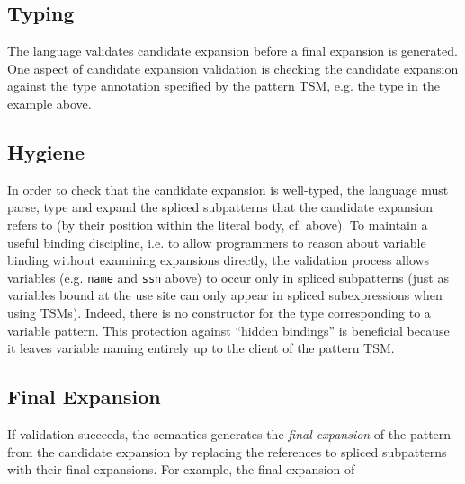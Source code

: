 {{{\subsection{Typing}\label{sec:ptsms-validation}
The language validates candidate expansion before a final expansion is generated. One aspect of candidate expansion validation is checking the candidate expansion against the type annotation specified by the pattern TSM, e.g. the type  in the example above.

\subsection{Hygiene}\label{sec:ptsms-hygiene}
In order to check that the candidate expansion is well-typed, the language must parse, type and expand the spliced subpatterns that the candidate expansion refers to (by their position within the literal body, cf. above). To maintain a useful binding discipline, i.e. to allow programmers to reason about variable binding without examining expansions directly, the validation process allows variables (e.g. \lstinline{name} and \lstinline{ssn} above) to occur only in spliced subpatterns (just as variables bound at the use site can only appear in spliced subexpressions when using TSMs). Indeed, there is no constructor for the type  corresponding to a variable pattern. This protection against ``hidden bindings'' is beneficial because it leaves variable naming entirely up to the client of the pattern TSM. 

\subsection{Final Expansion}\label{sec:ptsms-final-expansion}
If validation succeeds, the semantics generates the \emph{final expansion} of the pattern from the candidate expansion by replacing the references to spliced subpatterns with their final expansions. For example, the final expansion of \li{#\dolla#rx /SURL@EURLnameSURL: %
\begin{lstlisting}[numbers=none]
Seq(Str(name), Seq(Str "SSTR: ESTR", ssn))
\end{lstlisting}

\section{$\miniVersePat$}\label{sec:miniVerseUP}
\subsection{Expanded Expressions and Patterns}
}}}}
